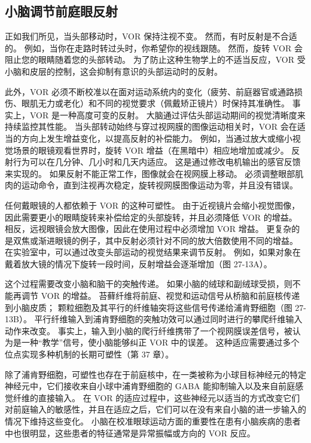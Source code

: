 \subsection{小脑调节前庭眼反射}
正如我们所见，当头部移动时，VOR 保持注视不变。 然而，有时反射是不合适的。 例如，当你在走路时转过头时，你希望你的视线跟随。 然而，旋转 VOR 会阻止您的眼睛随着您的头部转动。 为了防止这种生物学上的不适当反应，VOR 受小脑和皮层的控制，这会抑制有意识的头部运动时的反射。

此外，VOR 必须不断校准以在面对运动系统内的变化（疲劳、前庭器官或通路损伤、眼肌无力或老化）和不同的视觉要求（佩戴矫正镜片）时保持其准确性。 事实上，VOR 是一种高度可变的反射。 大脑通过评估头部运动期间的视觉清晰度来持续监控其性能。 当头部转动始终与穿过视网膜的图像运动相关时，VOR 会在适当的方向上发生增益变化，以提高反射的补偿能力。 例如，当通过放大或缩小视觉场景的眼镜观看世界时，旋转 VOR 增益（在黑暗中）相应地增加或减少。 反射行为可以在几分钟、几小时和几天内适应。 这是通过修改电机输出的感官反馈来实现的。 如果反射不能正常工作，图像就会在视网膜上移动。 必须调整眼部肌肉的运动命令，直到注视再次稳定，旋转视网膜图像运动为零，并且没有错误。

任何戴眼镜的人都依赖于 VOR 的这种可塑性。 由于近视镜片会缩小视觉图像，因此需要更小的眼睛旋转来补偿给定的头部旋转，并且必须降低 VOR 的增益。 相反，远视眼镜会放大图像，因此在使用过程中必须增加 VOR 增益。 更复杂的是双焦或渐进眼镜的例子，其中反射必须针对不同的放大倍数使用不同的增益。 在实验室中，可以通过改变头部运动的视觉结果来调节反射。 例如，如果对象在戴着放大镜的情况下旋转一段时间，反射增益会逐渐增加（图 27-13A）。

这个过程需要改变小脑和脑干的突触传递。 如果小脑的绒球和副绒球受损，则不能再调节 VOR 的增益。 苔藓纤维将前庭、视觉和运动信号从桥脑和前庭核传递到小脑皮质； 颗粒细胞及其平行的纤维轴突将这些信号传递给浦肯野细胞（图 27-13B）。 平行纤维输入到浦肯野细胞的突触功效可以通过同时进行的攀爬纤维输入动作来改变。 事实上，输入到小脑的爬行纤维携带了一个视网膜误差信号，被认为是一种“教学”信号，使小脑能够纠正 VOR 中的误差。 这种适应需要通过多个位点实现多种机制的长期可塑性（第 37 章）。

除了浦肯野细胞，可塑性也存在于前庭核中，在一类被称为小球目标神经元的特定神经元中，它们接收来自小球中浦肯野细胞的 GABA 能抑制输入以及来自前庭感觉纤维的直接输入。 在 VOR 的适应过程中，这些神经元以适当的方式改变它们对前庭输入的敏感性，并且在适应之后，它们可以在没有来自小脑的进一步输入的情况下维持这些变化。 小脑在校准眼球运动方面的重要性在患有小脑疾病的患者中也很明显，这些患者的特征通常是异常振幅或方向的 VOR 反应。

